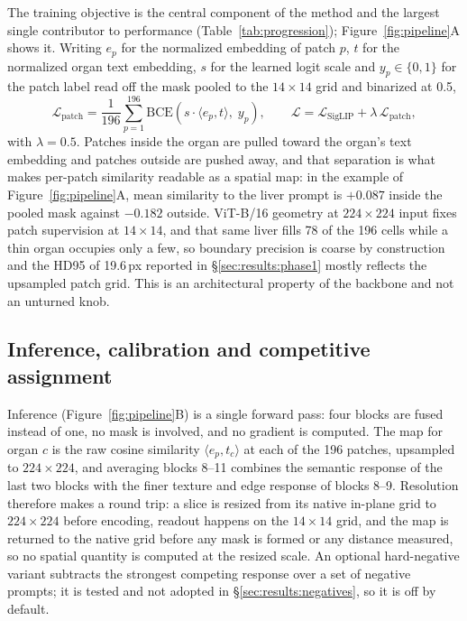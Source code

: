 \documentclass[10pt]{article}
\begin{document}
The training objective is the central component of the method and the largest
single contributor to performance (Table~\ref{tab:progression});
Figure~\ref{fig:pipeline}A shows it. Writing $e_p$ for the normalized embedding of
patch $p$, $t$ for the normalized organ text embedding, $s$ for the learned logit
scale and $y_p\in\{0,1\}$ for the patch label read off the mask pooled to the
$14\times14$ grid and binarized at 0.5,
\begin{equation}
\mathcal{L}_{\text{patch}}
  = \frac{1}{196}\sum_{p=1}^{196}
    \mathrm{BCE}\!\left(s \cdot \langle e_p, t\rangle,\; y_p\right),
\qquad
\mathcal{L} = \mathcal{L}_{\text{SigLIP}} + \lambda\,\mathcal{L}_{\text{patch}},
\end{equation}
with $\lambda = 0.5$. Patches inside the organ are pulled toward the organ's text
embedding and patches outside are pushed away, and that separation is what makes
per-patch similarity readable as a spatial map: in the example of
Figure~\ref{fig:pipeline}A, mean similarity to the liver prompt is $+0.087$
inside the pooled mask against $-0.182$ outside. ViT-B/16 geometry at
$224\times224$ input fixes patch supervision at $14\times14$, and that same liver
fills 78 of the 196 cells while a thin organ occupies only a few, so boundary
precision is coarse by construction and the HD95 of 19.6\,px reported in
\S\ref{sec:results:phase1} mostly reflects the upsampled patch grid. This is an
architectural property of the backbone and not an unturned knob.

\subsection{Inference, calibration and competitive assignment}
\label{sec:methods:inference}

Inference (Figure~\ref{fig:pipeline}B) is a single forward pass: four blocks are
fused instead of one, no mask is involved, and no gradient is computed. The map
for organ $c$ is the raw cosine similarity $\langle e_p, t_c\rangle$ at each of
the 196 patches, upsampled to $224\times224$, and averaging blocks 8--11 combines
the semantic response of the last two blocks with the finer texture and edge
response of blocks 8--9. Resolution therefore makes a round trip: a slice is
resized from its native in-plane grid to $224\times224$ before encoding, readout
happens on the $14\times14$ grid, and the map is returned to the native grid
before any mask is formed or any distance measured, so no spatial quantity is
computed at the resized scale. An optional hard-negative variant subtracts the strongest
competing response over a set of negative prompts; it is tested and not adopted in
\S\ref{sec:results:negatives}, so it is off by default.
\end{document}
